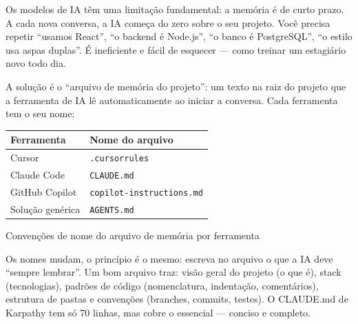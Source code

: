 


Os modelos de IA têm uma limitação fundamental: a memória é de curto prazo. A cada nova conversa, a IA começa do zero sobre o seu projeto. Você precisa repetir “usamos React”, “o backend é Node.js”, “o banco é PostgreSQL”, “o estilo usa aspas duplas”. É ineficiente e fácil de esquecer — como treinar um estagiário novo todo dia.

A solução é o “arquivo de memória do projeto”: um texto na raiz do projeto que a ferramenta de IA lê automaticamente ao iniciar a conversa. Cada ferramenta tem o seu nome:

\begin{center}
\begin{tabularx}{\linewidth}{|X|X|}
\hline
\textbf{Ferramenta} & \textbf{Nome do arquivo} \tabularnewline
\hline
Cursor & \texttt{.\allowbreak cursorrules} \tabularnewline
Claude Code & \texttt{CLAUDE.\allowbreak md} \tabularnewline
GitHub Copilot & \texttt{copilot-\allowbreak instructions.\allowbreak md} \tabularnewline
Solução genérica & \texttt{AGENTS.\allowbreak md} \tabularnewline
\hline
\end{tabularx}
\end{center}

\begin{center}\small\color{gray}Convenções de nome do arquivo de memória por ferramenta\end{center}

Os nomes mudam, o princípio é o mesmo: escreva no arquivo o que a IA deve “sempre lembrar”. Um bom arquivo traz: visão geral do projeto (o que é), stack (tecnologias), padrões de código (nomenclatura, indentação, comentários), estrutura de pastas e convenções (branches, commits, testes). O CLAUDE.md de Karpathy tem só 70 linhas, mas cobre o essencial — conciso e completo.

